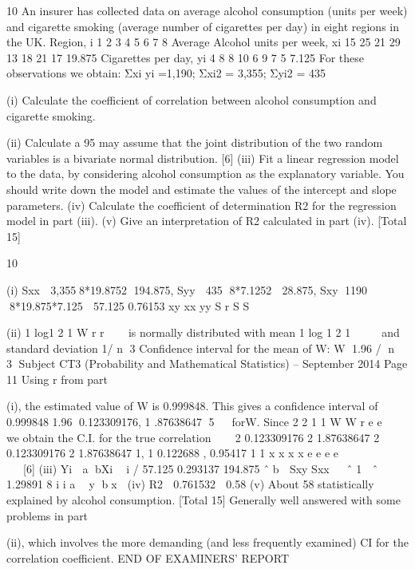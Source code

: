 
10 An insurer has collected data on average alcohol consumption (units per week) and
cigarette smoking (average number of cigarettes per day) in eight regions in the UK.
Region, i 1 2 3 4 5 6 7 8 Average
Alcohol units per week, xi 15 25 21 29 13 18 21 17 19.875
Cigarettes per day, yi 4 8 8 10 6 9 7 5 7.125
For these observations we obtain:
  Σxi yi =1,190; Σxi2 = 3,355; Σyi2 = 435
\item (i) Calculate the coefficient of correlation between alcohol consumption and
cigarette smoking. 
\item (ii) Calculate a 95%
may assume that the joint distribution of the two random variables is a
bivariate normal distribution. [6]
(iii) Fit a linear regression model to the data, by considering alcohol consumption
as the explanatory variable. You should write down the model and estimate
the values of the intercept and slope parameters. 
(iv) Calculate the coefficient of determination R2 for the regression model in
part (iii). 
(v) Give an interpretation of R2 calculated in part (iv). 
[Total 15]

10 \item (i) Sxx  3,3558*19.8752 194.875,
Syy  435 8*7.1252  28.875,
Sxy 1190 8*19.875*7.125  57.125
0.76153
xy
xx yy
S
r
S S
  
\item (ii) 1 log1
2 1
W r
r



is normally distributed with mean 1 log 1
2 1
 
 
and standard
deviation 1/ n 3
Confidence interval for the mean of W: W 1.96 / n  3
Subject CT3 (Probability and Mathematical Statistics) – September 2014 
Page 11
Using r from part \item (i), the estimated value of W is 0.999848.
This gives a confidence interval of
0.999848 1.96 0.123309176, 1 .87638647
5
  forW.
Since
2
2
1
1
W
W
r e
e



we obtain the C.I. for the true correlation 
 
2 0.123309176 2 1.87638647
2 0.123309176 2 1.87638647
1, 1 0.122688 , 0.95417
1 1
x x
x x
e e
e e
   
  
   
[6]
(iii) Yi  a bXi  i
/ 57.125 0.293137
194.875
ˆ b  Sxy Sxx  
ˆ 1  ˆ  1.29891
8 i i a  y bx  
(iv) R2  0.761532  0.58 
(v) About 58%
statistically explained by alcohol consumption. 
[Total 15]
Generally well answered with some problems in part \item (ii), which involves the more demanding
(and less frequently examined) CI for the correlation coefficient.
END OF EXAMINERS’ REPORT
